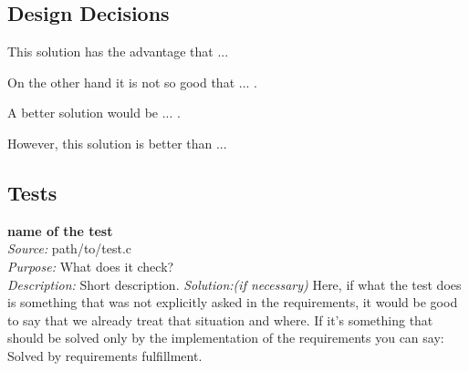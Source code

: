{    %



    \subsection{Design Decisions}

	This solution has the advantage that ... 

	On the other hand it is not so good that ... . 

	A better solution would be ... . 

	However, this solution is better than ...

    \subsection{Tests}

    \textbf{name of the test}\\
    \textit{Source:} path/to/test.c\\
    \textit{Purpose:} What does it check?\\
    \textit{Description:} Short description.
    \textit{Solution:(if necessary)} Here, if what the test does is something that was not explicitly asked in the requirements, it would be good to say that we already treat that situation and where. If it's something that should be solved only by the implementation of the requirements you can say: Solved by requirements fulfillment.
	

}
